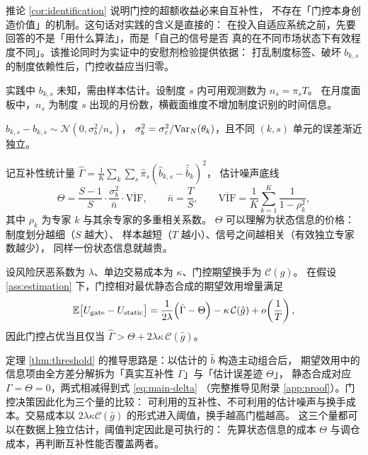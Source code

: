 推论 \ref{cor:identification} 说明门控的超额收益必来自互补性，
不存在「门控本身创造价值」的机制。这句话对实践的含义是直接的：
在投入自适应系统之前，先要回答的不是「用什么算法」，而是「自己的信号是否
真的在不同市场状态下有效程度不同」。该推论同时为实证中的安慰剂检验提供依据：
打乱制度标签、破坏 $b_{k,s}$ 的制度依赖性后，门控收益应当归零。

实践中 $b_{k,s}$ 未知，需由样本估计。设制度 $s$ 内可用观测数为 $n_s=\pi_sT$。
在月度面板中，$n_s$ 为制度 $s$ 出现的月份数，横截面维度不增加制度识别的时间信息。

\begin{assumption}[估计误差]
\label{ass:estimation}
$\hat b_{k,s}-b_{k,s}\sim\mathcal{N}(0,\sigma_b^2/n_s)$，
$\sigma_b^2=\sigma_\varepsilon^2/\mathrm{Var}_N(\theta_k)$，且不同 $(k,s)$ 单元的误差渐近独立。
\end{assumption}

记互补性统计量 $\hat\Gamma=\frac1K\sum_k\sum_s\hat\pi_s(\hat b_{k,s}-\hat{\bar b}_k)^2$，
估计噪声底线
\begin{equation}
\Theta=\frac{S-1}{S}\cdot\frac{\sigma_b^2}{\bar n}\cdot\overline{\mathrm{VIF}},
\qquad \bar n=\frac{T}{S},
\qquad
\overline{\mathrm{VIF}}=\frac1K\sum_{k=1}^K\frac{1}{1-\rho_k^2},
\label{eq:theta-def}
\end{equation}
其中 $\rho_k$ 为专家 $k$ 与其余专家的多重相关系数。
$\Theta$ 可以理解为状态信息的价格：制度划分越细（$S$ 越大）、
样本越短（$T$ 越小）、信号之间越相关（有效独立专家数越少），
同样一份状态信息就越贵。

\begin{theorem}[门控占优的充要条件]
\label{thm:threshold}
设风险厌恶系数为 $\lambda$、单边交易成本为 $\kappa$、门控期望换手为 $\mathcal{C}(\hat g)$。
在假设 \ref{ass:estimation} 下，门控相对最优静态合成的期望效用增量满足
\begin{equation}
\mathbb{E}\big[U_{\text{gate}}-U_{\text{static}}\big]
=\frac{1}{2\lambda}\Big(\hat\Gamma-\Theta\Big)-\kappa\,\mathcal{C}(\hat g)
+o\!\left(\frac1T\right),
\label{eq:main-delta}
\end{equation}
因此门控占优当且仅当
$\hat\Gamma>\Theta+2\lambda\kappa\,\mathcal{C}(\hat g)$。
\end{theorem}

定理 \ref{thm:threshold} 的推导思路是：以估计的 $\hat b$ 构造主动组合后，
期望效用中的信息项由全方差分解拆为「真实互补性 $\Gamma$」与「估计误差迹 $\Theta$」，
静态合成对应 $\Gamma=\Theta=0$，两式相减得到式 \eqref{eq:main-delta}
（完整推导见附录 \ref{app:proof}）。门控决策因此化为三个量的比较：
可利用的互补性、不可利用的估计噪声与换手成本。交易成本以
$2\lambda\kappa\mathcal{C}(\hat g)$ 的形式进入阈值，换手越高门槛越高。
这三个量都可以在数据上独立估计，阈值判定因此是可执行的：
先算状态信息的成本 $\Theta$ 与调仓成本，再判断互补性能否覆盖两者。

